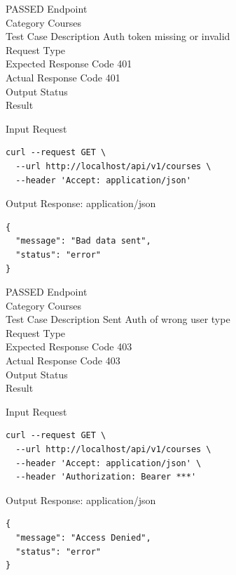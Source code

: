 \begin{testcase}{75}{PASSED}
Endpoint \hfill {}\\
Category \hfill Courses\\
Test Case Description \hfill Auth token missing or invalid\\

Request Type    \hfill {}\\
Expected Response Code    \hfill 401\\
Actual Response Code    \hfill 401\\

Output Status \hfill {}\\
Result \hfill {}

\begin{ipblock}{Input Request}
\begin{verbatim}
curl --request GET \
  --url http://localhost/api/v1/courses \
  --header 'Accept: application/json' 
\end{verbatim}
\end{ipblock}

\begin{opblock}{Output Response: application/json}
\begin{verbatim}
{
  "message": "Bad data sent",
  "status": "error"
}
\end{verbatim}
\end{opblock}
\end{testcase}

\begin{testcase}{76}{PASSED}
Endpoint \hfill {}\\
Category \hfill Courses\\
Test Case Description \hfill Sent Auth of wrong user type\\

Request Type    \hfill {}\\
Expected Response Code    \hfill 403\\
Actual Response Code    \hfill 403\\

Output Status \hfill {}\\
Result \hfill {}

\begin{ipblock}{Input Request}
\begin{verbatim}
curl --request GET \
  --url http://localhost/api/v1/courses \
  --header 'Accept: application/json' \
  --header 'Authorization: Bearer ***'
\end{verbatim}
\end{ipblock}

\begin{opblock}{Output Response: application/json}
\begin{verbatim}
{
  "message": "Access Denied",
  "status": "error"
}
\end{verbatim}
\end{opblock}
\end{testcase}

